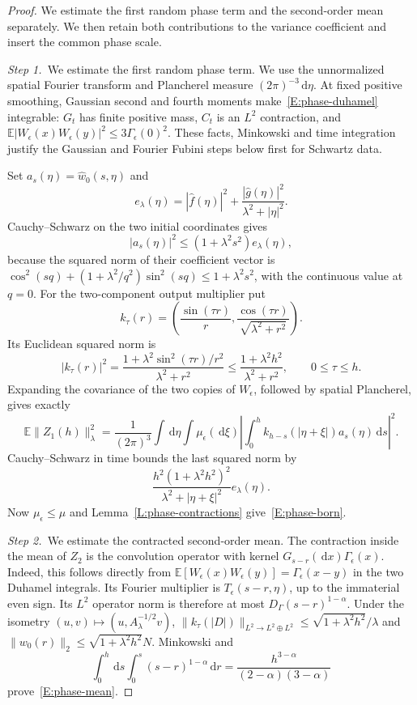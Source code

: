 \documentclass[12pt,oneside,openany]{book}
\numberwithin{equation}{section}
\theoremstyle{nogostyle}
\theoremstyle{definition}
\newcommand{\E}{\mathbb{E}}
\newcommand{\ud}{\,\mathrm{d}}
\begin{document}
\begin{proof}
  We estimate the first random phase term and the second-order mean
  separately. We then retain both contributions to the variance coefficient
  and insert the common phase scale.


  \medskip
  \noindent\textit{Step 1.~}We estimate the first random phase term.
  We use the unnormalized spatial Fourier transform and Plancherel measure
  $(2\pi)^{-3}\ud\eta$. At fixed positive smoothing, Gaussian second and fourth
  moments make~\eqref{E:phase-duhamel} integrable: $G_t$ has finite positive
  mass, $C_t$ is an $L^2$ contraction, and $\E|W_\epsilon(x)W_\epsilon(y)|^2 \le
  3\Gamma_\epsilon(0)^2$. These facts, Minkowski and time integration justify
  the Gaussian and Fourier Fubini steps below first for Schwartz data.

  Set $a_s(\eta) = \widehat{w}_0(s,\eta)$ and
  \[
    e_\lambda(\eta)=|\widehat{f}(\eta)|^2+
    \frac{|\widehat{g}(\eta)|^2}{\lambda^2+|\eta|^2}.
  \]
  Cauchy--Schwarz on the two initial coordinates gives
  \[
    |a_s(\eta)|^2\le(1+\lambda^2s^2)e_\lambda(\eta),
  \]
  because the squared norm of their coefficient vector is
  $\cos^2(sq)+(1+\lambda^2/q^2)\sin^2(sq) \le 1+\lambda^2s^2$, with the
  continuous value at $q = 0$. For the two-component output multiplier put
  \[
    k_\tau(r)=\left(\frac{\sin(\tau r)}r,
    \frac{\cos(\tau r)}{\sqrt{\lambda^2+r^2}}\right).
  \]
  Its Euclidean squared norm is
  \[
    |k_\tau(r)|^2
    =\frac{1+\lambda^2\sin^2(\tau r)/r^2}{\lambda^2+r^2}
    \le\frac{1+\lambda^2h^2}{\lambda^2+r^2},\qquad 0\le\tau\le h.
  \]
  Expanding the covariance of the two copies of $W_\epsilon$, followed by
  spatial Plancherel, gives exactly
  \[
    \E\|Z_1(h)\|_\lambda^2
    =\frac1{(2\pi)^3}\int\ud\eta\int\mu_\epsilon(\ud\xi)
    \left|\int_0^h k_{h-s}(|\eta+\xi|)a_s(\eta)\ud s\right|^2.
  \]
  Cauchy--Schwarz in time bounds the last squared norm by
  \[
    \frac{h^2(1+\lambda^2h^2)^2}
    {\lambda^2+|\eta+\xi|^2}e_\lambda(\eta).
  \]
  Now $\mu_\epsilon \le \mu$ and Lemma~\ref{L:phase-contractions}
  give~\eqref{E:phase-born}.


  \medskip
  \noindent\textit{Step 2.~}We estimate the contracted second-order mean.
  The contraction inside the mean of $Z_2$ is the convolution operator with
  kernel $G_{s-r}(\ud x)\Gamma_\epsilon(x)$. Indeed, this follows directly from
  $\E[W_\epsilon(x)W_\epsilon(y)] = \Gamma_\epsilon(x-y)$ in the two Duhamel
  integrals. Its Fourier multiplier is $T_\epsilon(s-r,\eta)$, up to the
  immaterial even sign. Its $L^2$ operator norm is therefore at most
  $D_\Gamma(s-r)^{1-\alpha}$. Under the isometry
  $(u,v)\mapsto(u,A_\lambda^{-1/2}v)$, $\|k_\tau(|D|)\|_{L^2\to L^2\oplus L^2}
  \le \sqrt{1+\lambda^2h^2}/\lambda$ and $\|w_0(r)\|_2 \le
  \sqrt{1+\lambda^2h^2}N$. Minkowski and
  \[
    \int_0^h\ud s\int_0^s(s-r)^{1-\alpha}\ud r
    =\frac{h^{3-\alpha}}{(2-\alpha)(3-\alpha)}
  \]
  prove~\eqref{E:phase-mean}.



\end{proof}
\end{document}
